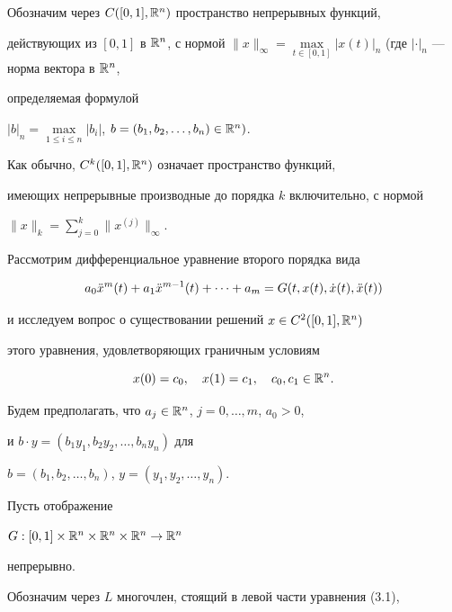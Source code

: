 Обозначим через $C([0,1],{\Bbb R}^n)$ пространство непрерывных функций,


действующих из $[0,1]$ в ${\Bbb R}^n$, с нормой $\|x\|_\infty=\max\limits


_{t\in [0,1]}|x(t)|_n$ (где $|\cdot |_n$ --- норма вектора в ${\Bbb R}^n$,


определяемая формулой


$|b|_n=\max\limits_{1\leq i\leq n}|b_i|$, $b=(b_1,b_2, \dotsc, b_n)\in 


{\Bbb R}^n)$.


Как обычно, $C^k([0,1],{\Bbb R}^n)$ означает пространство функций,


имеющих непрерывные производные до порядка $k$ включительно, с нормой


$\|x\|_k=\sum\limits_{j=0}^k\|x^{(j)}\|_\infty$.


Рассмотрим дифференциальное уравнение второго порядка вида


\begin{equation}


a_0\Ddot x^m(t) + a_1\Ddot x^{m-1}(t) + \dotsb + a_m =


G(t, x(t),\Dot x(t),\Ddot x(t)) 


\end{equation}


и исследуем вопрос о существовании решений $x\in C^2([0,1],{\Bbb R}^n)$


этого уравнения, удовлетворяющих граничным условиям


\begin{equation}


x(0)=c_0,\quad


x(1)=c_1, \quad c_0, c_1 \in {\Bbb R}^n.


\end{equation}


Будем предполагать, что $a_j\in {\Bbb R}^n$, $j=0, \dotsc, m$, $a_0>0$,


и $b\cdot y= (b_1y_1, b_2y_2, \dotsc, b_ny_n)$ для


$b=(b_1, b_2, \dotsc, b_n)$,  $y=(y_1, y_2, \dotsc, y_n)$.


Пусть отображение


$G:[0,1]\times


{\Bbb R}^n \times {\Bbb R}^n \times {\Bbb R}^n\rightarrow {\Bbb R}^n$ 


непрерывно.





Обозначим через $L$ многочлен, стоящий в левой части уравнения (3.1),


